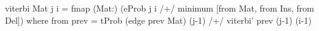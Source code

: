 viterbi Mat j i = fmap (Mat:)
  (eProb j i /+/ minimum [from Mat, from Ins, from Del]) 
 where from prev = tProb (edge prev Mat) (j-1) /+/
                               viterbi' prev (j-1) (i-1)
